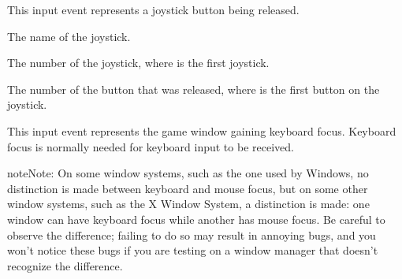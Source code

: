 \documentclass[letterpaper,10pt,english]{sphinxmanual}
\begin{document}
\begin{fulllineitems}
\label{input:sge.input.JoystickButtonRelease}
This input event represents a joystick button being released.

\begin{fulllineitems}
\label{input:sge.input.JoystickButtonRelease.js_name}
The name of the joystick.

\end{fulllineitems}


\begin{fulllineitems}
\label{input:sge.input.JoystickButtonRelease.js_id}
The number of the joystick, where  is the first joystick.

\end{fulllineitems}


\begin{fulllineitems}
\label{input:sge.input.JoystickButtonRelease.button}
The number of the button that was released, where  is the
first button on the joystick.

\end{fulllineitems}


\end{fulllineitems}


\begin{fulllineitems}
\label{input:sge.input.KeyboardFocusGain}
This input event represents the game window gaining keyboard focus.
Keyboard focus is normally needed for keyboard input to be received.

\begin{notice}{note}{Note:}
On some window systems, such as the one used by Windows, no
distinction is made between keyboard and mouse focus, but on
some other window systems, such as the X Window System, a
distinction is made: one window can have keyboard focus while
another has mouse focus.  Be careful to observe the
difference; failing to do so may result in annoying bugs,
and you won't notice these bugs if you are testing on a
window manager that doesn't recognize the difference.
\end{notice}

\end{fulllineitems}
\end{document}

